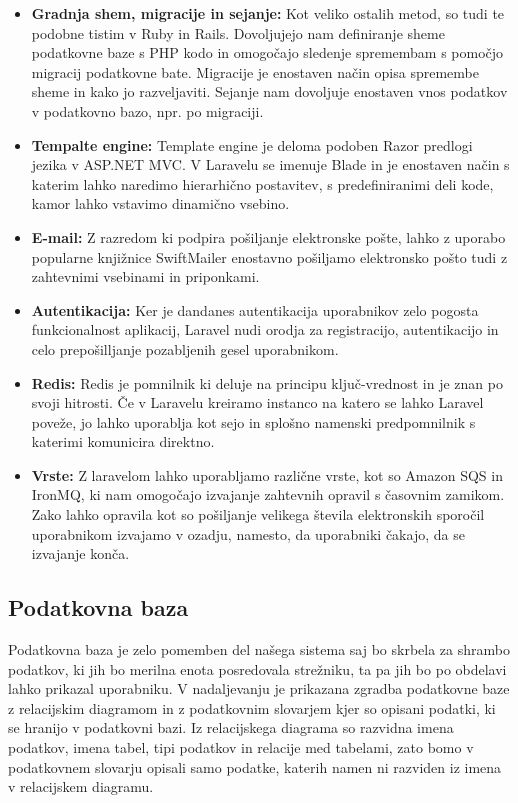 \documentclass[12pt,a4paper,titlepage,openany]{report}
\begin{document}
\begin{itemize}
\item \textbf{Gradnja shem, migracije in sejanje:}
Kot veliko ostalih metod, so tudi te podobne tistim v Ruby in Rails. Dovoljujejo nam definiranje sheme podatkovne baze s PHP kodo in omogočajo sledenje spremembam s pomočjo migracij podatkovne bate. Migracije je enostaven način opisa spremembe sheme in kako jo razveljaviti. Sejanje nam dovoljuje enostaven vnos podatkov v podatkovno bazo, npr. po migraciji.

\item \textbf{Tempalte engine:}
Template engine je deloma podoben Razor predlogi jezika v ASP.NET MVC. V Laravelu se imenuje Blade in je enostaven način s katerim lahko naredimo hierarhično postavitev, s predefiniranimi deli kode, kamor lahko vstavimo dinamično vsebino.

\item \textbf{E-mail:}
Z razredom ki podpira pošiljanje elektronske pošte, lahko z uporabo popularne knjižnice SwiftMailer enostavno pošiljamo elektronsko pošto tudi z zahtevnimi vsebinami in priponkami.

\item \textbf{Autentikacija:}
Ker je dandanes autentikacija uporabnikov zelo pogosta funkcionalnost aplikacij, Laravel nudi orodja za registracijo, autentikacijo in celo prepošilljanje pozabljenih gesel uporabnikom.

\item \textbf{Redis:}
Redis je pomnilnik ki deluje na principu ključ-vrednost in je znan po svoji hitrosti. Če v Laravelu kreiramo instanco na katero se lahko Laravel poveže, jo lahko uporablja kot sejo in splošno namenski predpomnilnik s katerimi komunicira direktno.

\item \textbf{Vrste:}
Z laravelom lahko uporabljamo različne vrste, kot so Amazon SQS in IronMQ, ki nam omogočajo izvajanje zahtevnih opravil s časovnim zamikom. Zako lahko opravila kot so pošiljanje velikega števila elektronskih sporočil uporabnikom izvajamo v ozadju, namesto, da uporabniki čakajo, da se izvajanje konča.
\end{itemize}

\subsection{Podatkovna baza}
Podatkovna baza je zelo pomemben del našega sistema saj bo skrbela za shrambo podatkov, ki jih bo merilna enota posredovala strežniku, ta pa jih bo po obdelavi lahko prikazal uporabniku. V nadaljevanju je prikazana zgradba podatkovne baze z relacijskim diagramom in z podatkovnim slovarjem kjer so opisani podatki, ki se hranijo v podatkovni bazi. Iz relacijskega diagrama so razvidna imena podatkov, imena tabel, tipi podatkov in relacije med tabelami, zato bomo v podatkovnem slovarju opisali samo podatke, katerih namen ni razviden iz imena v relacijskem diagramu.
\end{document}
